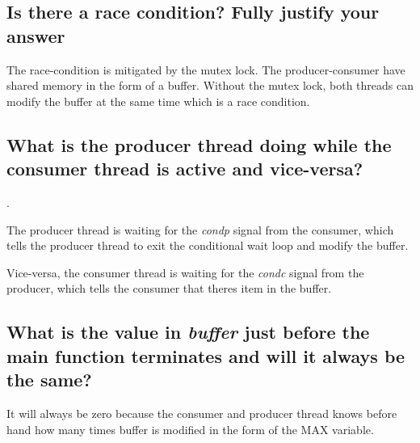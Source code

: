 \subsection{Is there a race condition? Fully justify your answer}

The race-condition is mitigated by the mutex lock. The producer-consumer have shared memory in the form
of a buffer. Without the mutex lock, both threads can modify the buffer at the same time which is a race
condition.


\subsection{What is the producer thread doing while the consumer thread is active and vice-versa?}.

The producer thread is waiting for the \emph{condp} signal from the consumer, which tells the producer 
thread to exit the conditional wait loop and modify the buffer.

Vice-versa, the consumer thread is waiting for the \emph{condc} signal from the producer, which tells
the consumer that theres item in the buffer.


\subsection{What is the value in \emph{buffer} just before the main function terminates and will it always be the same?}

It will always be zero because the consumer and producer thread knows before hand how many times buffer is 
modified in the form of the MAX variable.





